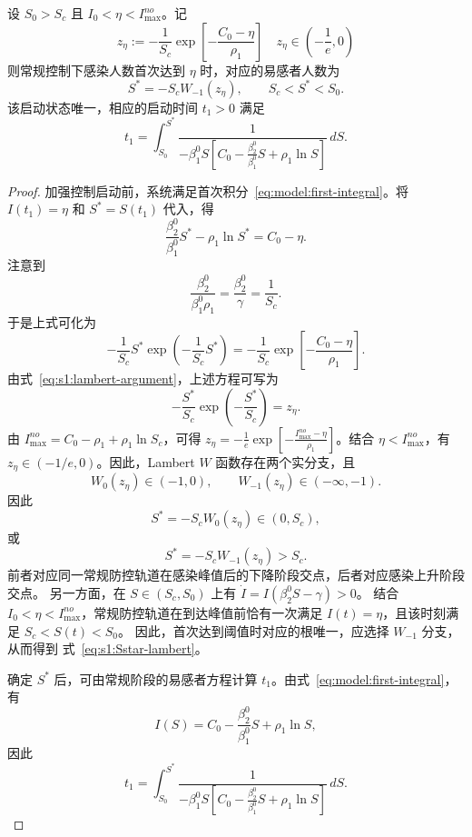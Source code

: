 \documentclass[lang=cn,a4paper,newtx]{elegantpaper}
\numberwithin{equation}{section}
\theoremstyle{plain}
\begin{document}
\begin{theorem}
\label{thm:s1:trigger}
设 $S_0>S_c$ 且 $I_0<\eta<I_{\max}^{no}$。记
\begin{equation}
z_\eta:=
-\frac{1}{S_c}
\exp\left[-\frac{C_0-\eta}{\rho_1}\right] \quad z_\eta\in\left(-\frac{1}{e},0\right)
\label{eq:s1:lambert-argument}
\end{equation}
则常规控制下感染人数首次达到 $\eta$ 时，对应的易感者人数为
\begin{equation}
S^*=-S_cW_{-1}(z_\eta),
\qquad
S_c<S^*<S_0.
\label{eq:s1:Sstar-lambert}
\end{equation}
该启动状态唯一，相应的启动时间 $t_1>0$ 满足
\begin{equation}
t_1
=
\int_{S_0}^{S^*}
\frac{1}{
-\beta_1^0S\left[
C_0-\frac{\beta_2^0}{\beta_1^0}S+\rho_1\ln S
\right]
}\,dS.
\label{eq:s1:t1}
\end{equation}
\end{theorem}
\begin{proof}
加强控制启动前，系统满足首次积分~\eqref{eq:model:first-integral}。将 $I(t_1)=\eta$ 和 $S^*=S(t_1)$ 代入，得
\[
\frac{\beta_2^0}{\beta_1^0}S^*-\rho_1\ln S^*
=C_0-\eta.
\]
注意到
\[
\frac{\beta_2^0}{\beta_1^0\rho_1}
=
\frac{\beta_2^0}{\gamma}
=
\frac{1}{S_c}.
\]
于是上式可化为
\[
-\frac{1}{S_c}S^*
\exp\left(-\frac{1}{S_c}S^*\right)
=
-\frac{1}{S_c}
\exp\left[-\frac{C_0-\eta}{\rho_1}\right].
\]
由式~\eqref{eq:s1:lambert-argument}，上述方程可写为
\[
-\frac{S^*}{S_c}
\exp\left(-\frac{S^*}{S_c}\right)
=z_\eta.
\]
由 $I_{\max}^{no}=C_0-\rho_1+\rho_1\ln S_c$，可得 $z_{\eta}=-\frac{1}{e}\exp\left[-\frac{I_{\max}^{no}-\eta}{\rho_1}\right]$。结合 $\eta<I_{\max}^{no}$，有 $z_\eta\in(-1/e,0)$。因此，Lambert $W$ 函数存在两个实分支，且
\[
W_0(z_\eta)\in(-1,0),
\qquad
W_{-1}(z_\eta)\in(-\infty,-1).
\]
因此
\[
S^*=-S_cW_0(z_\eta)\in(0,S_c),
\]
或
\[
S^*=-S_cW_{-1}(z_\eta)>S_c.
\]
前者对应同一常规防控轨道在感染峰值后的下降阶段交点，后者对应感染上升阶段交点。
另一方面，在 $S\in(S_c,S_0)$ 上有
$\dot I=I(\beta_2^0S-\gamma)>0$。
结合 $I_0<\eta<I_{\max}^{no}$，常规防控轨道在到达峰值前恰有一次满足
$I(t)=\eta$，且该时刻满足 $S_c<S(t)<S_0$。
因此，首次达到阈值时对应的根唯一，应选择 $W_{-1}$ 分支，从而得到
式~\eqref{eq:s1:Sstar-lambert}。

确定 $S^*$ 后，可由常规阶段的易感者方程计算 $t_1$。由式~\eqref{eq:model:first-integral}，有
\[
I(S)=
C_0-\frac{\beta_2^0}{\beta_1^0}S+\rho_1\ln S,
\]
因此
\[
t_1
=
\int_{S_0}^{S^*}
\frac{1}{
-\beta_1^0S\left[
C_0-\frac{\beta_2^0}{\beta_1^0}S+\rho_1\ln S
\right]
}\,dS.
\]

\end{proof}
\end{document}

